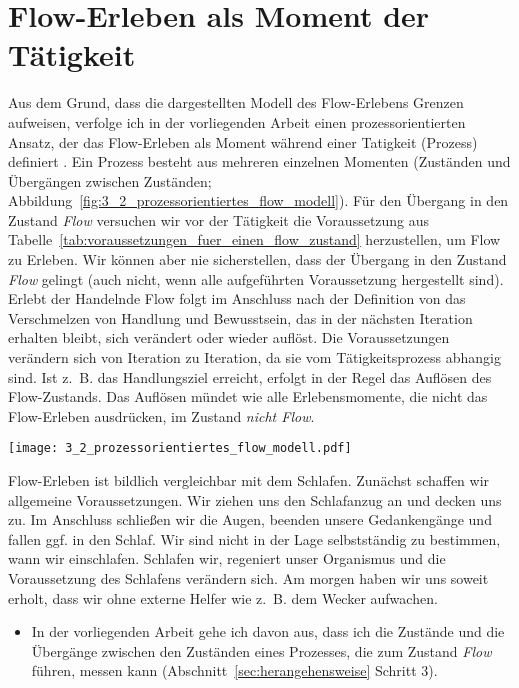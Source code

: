 

\section{Flow-Erleben als Moment der Tätigkeit} 

\label{sec:flow_erleben_als_moment_der_tatigkeit}

Aus dem Grund, dass die dargestellten Modell des Flow-Erlebens Grenzen aufweisen, verfolge ich in der vorliegenden Arbeit einen prozessorientierten Ansatz, der das Flow-Erleben als Moment während einer Tatigkeit (Prozess) definiert \citep[][S.~2]{Grueter2006}. Ein Prozess besteht aus mehreren einzelnen Momenten (Zuständen und Übergängen zwischen Zuständen; Abbildung~\ref{fig:3_2_prozessorientiertes_flow_modell}). Für den Übergang in den Zustand \emph{Flow} versuchen wir vor der Tätigkeit die Voraussetzung aus Tabelle~\ref{tab:voraussetzungen_fuer_einen_flow_zustand} herzustellen, um Flow zu Erleben. Wir können aber nie sicherstellen, dass der Übergang in den Zustand \emph{Flow} gelingt (auch nicht, wenn alle aufgeführten Voraussetzung hergestellt sind). Erlebt der Handelnde Flow folgt im Anschluss nach der Definition von \citet{Henk2014} das Verschmelzen von Handlung und Bewusstsein, das in der nächsten Iteration erhalten bleibt, sich verändert oder wieder auflöst. Die Voraussetzungen verändern sich von Iteration zu Iteration, da sie vom Tätigkeitsprozess abhangig sind. Ist z.~B. das Handlungsziel erreicht, erfolgt in der Regel das Auflösen des Flow-Zustands. Das Auflösen mündet wie alle Erlebensmomente, die nicht das Flow-Erleben ausdrücken, im Zustand \emph{nicht Flow}. 
\begin{sidewaysfigure}
	\texttt{[image: 3\_2\_prozessorientiertes\_flow\_modell.pdf]} \caption[Prozessorientiertes Modell des Flow-Erlebens (Einführung)]{Prozessorientiertes Modell mit Auslassungen der implizit messbaren Auswirkungen des Flow-Erlebens} \label{fig:3_2_prozessorientiertes_flow_modell} 
\end{sidewaysfigure}

Flow-Erleben ist bildlich vergleichbar mit dem Schlafen. Zunächst schaffen wir allgemeine Voraussetzungen. Wir ziehen uns den Schlafanzug an und decken uns zu. Im Anschluss schließen wir die Augen, beenden unsere Gedankengänge und fallen ggf. in den Schlaf. Wir sind nicht in der Lage selbstständig zu bestimmen, wann wir einschlafen. Schlafen wir, regeniert unser Organismus und die Voraussetzung des Schlafens verändern sich. Am morgen haben wir uns soweit erholt, dass wir ohne externe Helfer wie z.~B. dem Wecker aufwachen.
\begin{itemize}
	
	\item In der vorliegenden Arbeit gehe ich davon aus, dass ich die Zustände und die Übergänge zwischen den Zuständen eines Prozesses, die zum Zustand \emph{Flow} führen, messen kann (Abschnitt~\ref{sec:herangehensweise} Schritt 3).
\end{itemize}

